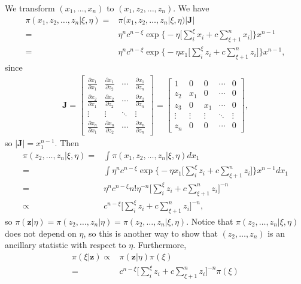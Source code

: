 \documentclass[12pt]{article}
\begin{document}
We transform $(x_1, \ldots, x_n)$ to $(x_1, z_2, \ldots, z_n)$.
We have
\begin{align*}
  \pi(x_1, z_2, \ldots, z_n | \xi, \eta)
  = & \pi(x_1, z_2, \ldots, z_n | \xi, \eta) |\bm{J}| \\
  = & \eta^n c^{n - \xi} \exp\big\{ -\eta\Big[\sum_i^\xi x_i + c \sum_{\xi+1}^n x_i\Big]\Big\} x^{n-1} \\
  = & \eta^n c^{n - \xi} \exp\big\{ -\eta x_1 \Big[\sum_i^\xi z_i + c \sum_{\xi+1}^n z_i\Big]\Big\} x^{n-1},
\end{align*}
since
\begin{align*}
  \bm{J}=
  \begin{bmatrix}
    \frac{\partial x_1}{\partial x_1} &  \frac{\partial x_1}{\partial z_2} & \cdots & \frac{\partial x_1}{\partial z_n} \\ 
    \frac{\partial x_2}{\partial x_1} &  \frac{\partial x_2}{\partial z_2} & \cdots & \frac{\partial x_2}{\partial z_n} \\ 
    \vdots & \vdots & \ddots & \vdots \\
    \frac{\partial x_n}{\partial x_1} &  \frac{\partial x_n}{\partial z_2} & \cdots & \frac{\partial x_n}{\partial z_n} 
  \end{bmatrix}
  =
  \begin{bmatrix}
    1 & 0 & 0 & \cdots & 0 \\
    z_2 & x_1 & 0 & \cdots & 0 \\
    z_3 & 0 & x_1 & \cdots & 0 \\
    \vdots & \vdots & \vdots & \ddots & \vdots \\
    z_n & 0 & 0 & \cdots & 0
  \end{bmatrix},
\end{align*}
so $|\bm{J}| = x_1^{n-1}$. 
Then 
\begin{align*}
  \pi(z_2, \ldots, z_n | \xi, \eta)
  = & \int \pi(x_1, z_2, \ldots, z_n | \xi, \eta) d x_1 \\
  = & \int \eta^n c^{n - \xi} \exp\big\{ -\eta x_1 \Big[\sum_i^\xi z_i + c \sum_{\xi+1}^n z_i\Big]\Big\} x^{n-1} d x_1  \\
  = & \eta^n c^{n-\xi} n! \eta^{-n} \Big[\sum_i^\xi z_i + c \sum_{\xi+1}^n z_i\Big]^{-n} \\
  \propto & c^{n-\xi} \Big[\sum_i^\xi z_i + c \sum_{\xi+1}^n z_i\Big]^{-n},
\end{align*}
so $\pi(\bm{z} | \eta) = \pi(z_2, \ldots, z_n | \eta) = \pi(z_2, \ldots, z_n | \xi, \eta)$.
Notice that $\pi(z_2, \ldots, z_n | \xi, \eta)$ does not depend on $\eta$,
so this is another way to show that $(z_2, \ldots, z_n)$ is an ancillary statistic with respect to $\eta$.
Furthermore,
\begin{align*}
  \pi(\xi|\bm{z})
  \propto & \pi(\bm{z} | \eta) \pi(\xi) \\
  = & c^{n-\xi} \Big[\sum_i^\xi z_i + c \sum_{\xi+1}^n z_i\Big]^{-n} \pi(\xi)
\end{align*}
\end{document}
